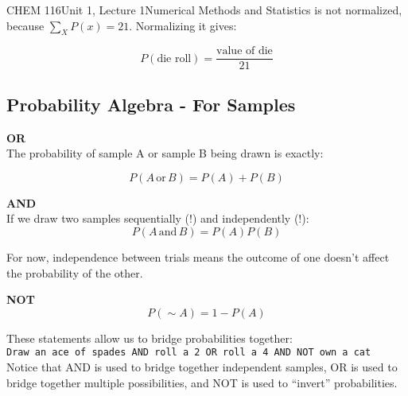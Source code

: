 \documentclass{article}
\begin{document}
\begin{tdoc}{CHEM 116}{Unit 1, Lecture 1}{Numerical Methods and Statistics}
is not normalized, because $\sum_X P(x) = 21$. Normalizing it gives:

\begin{equation}
P(\textrm{die roll}) = \frac{\textrm{value of die}}{21}
\end{equation}

\subsection{Probability Algebra - For Samples}

{\bf OR}\vspace{0.5cm}\\
The probability of sample A or sample B being drawn is exactly:

\begin{equation}
P(A\,\textrm{or}\,B) = P(A) + P(B)
\end{equation}
\vspace{0.2cm}

{\bf AND}\vspace{0.5cm}\\

If we draw two samples sequentially (!) and independently (!):
\begin{equation}
P(A\,\textrm{and}\,B) = P(A)P(B)
\end{equation}

For now, independence between trials means the outcome of one doesn't
affect the probability of the other.

\vspace{0.2cm}

{\bf NOT}\vspace{0.5cm}\\

\begin{equation}
P(\sim A) = 1 - P(A)
\end{equation}
\vspace{0.2cm}

These statements allow us to bridge probabilities together:\vspace{0.2cm}\\

\texttt{Draw an ace of spades AND roll a 2 OR roll a 4 AND NOT own a cat}\\

\vspace{0.2cm}Notice that AND is used to bridge together independent samples, OR is
used to bridge together multiple possibilities, and NOT is used to
``invert'' probabilities.\vspace{0.2cm}


\end{tdoc}
\end{document}
